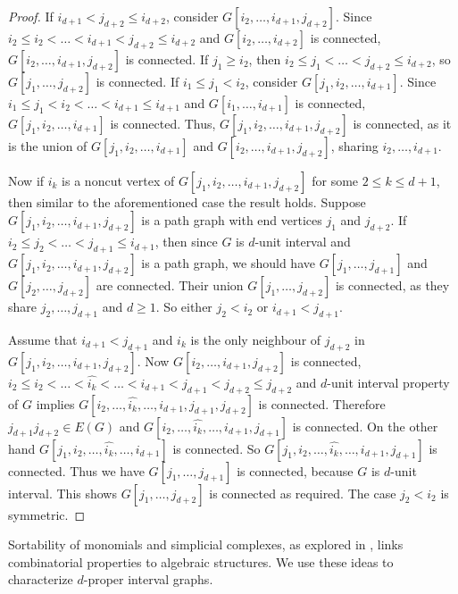 \documentclass[12pt,reqno]{amsart}
\theoremstyle{plain}
\theoremstyle{definition}
\numberwithin{equation}{section}
\begin{document}
\begin{proof}
If $i_{d+1} < j_{d+2} \leq i_{d+2}$, consider $G[i_2, \dots, i_{d+1}, j_{d+2}]$. Since $i_2 \leq i_2 < \dots < i_{d+1} < j_{d+2} \leq i_{d+2}$ and $G[i_2, \dots, i_{d+2}]$ is connected, $G[i_2, \dots, i_{d+1}, j_{d+2}]$ is connected. If $j_1 \geq i_2$, then $i_2 \leq j_1 < \dots < j_{d+2} \leq i_{d+2}$, so $G[j_1, \dots, j_{d+2}]$ is connected. If $i_1 \leq j_1 < i_2$, consider $G[j_1, i_2, \dots, i_{d+1}]$. Since $i_1 \leq j_1 < i_2 < \dots < i_{d+1} \leq i_{d+1}$ and $G[i_1, \dots, i_{d+1}]$ is connected, $G[j_1, i_2, \dots, i_{d+1}]$ is connected. Thus, $G[j_1, i_2, \dots, i_{d+1}, j_{d+2}]$ is connected, as it is the union of $G[j_1, i_2, \dots, i_{d+1}]$ and $G[i_2, \dots, i_{d+1}, j_{d+2}]$, sharing $i_2, \dots, i_{d+1}$.

Now if  $i_k$ is a noncut vertex of $G[j_1, i_2 , \dots , i_{d+1}, j_{d+2}]$ for some $2\leq k \leq d+1$, then similar to the aforementioned case the result holds. Suppose $G[j_1, i_2 , \dots , i_{d+1}, j_{d+2}]$ is a path graph with end vertices $j_1$ and $j_{d+2}$. If $i_2\leq j_2<\dots <j_{d+1} \leq i_{d+1}$, then since $G$ is $d$-unit interval and $G[j_1, i_2 , \dots , i_{d+1}, j_{d+2}]$ is a path graph, we should have $G[j_1, \dots , j_{d+1}]$ and $G[j_2, \dots , j_{d+2}]$ are connected. Their union $G[j_1, \dots, j_{d+2}]$ is connected, as they share $j_2, \dots, j_{d+1}$ and $d \geq 1$. So either $j_2<i_2$ or $i_{d+1}<j_{d+1}$.

Assume that $i_{d+1}<j_{d+1}$ and $i_k$ is the only neighbour of $j_{d+2}$ in $G[j_1, i_2 , \dots , i_{d+1}, j_{d+2}]$. Now $G[i_2, \dots , i_{d+1}, j_{d+2}]$ is connected, $i_2\leq i_2< \dots <\widehat{i_k} < \dots < i_{d+1}<j_{d+1}<j_{d+2}\leq j_{d+2}$ and $d$-unit interval property of $G$ implies $G[ i_2, \dots , \widehat{i_k}, \dots , i_{d+1},j_{d+1},j_{d+2}]$ is connected.  Therefore  $j_{d+1}j_{d+2}\in E(G)$ and $G[ i_2, \dots , \widehat{i_k}, \dots , i_{d+1},j_{d+1}]$ is connected. On the other hand  $G[j_1, i_2, \dots , \widehat{i_k}, \dots , i_{d+1}]$ is connected. So $G[j_1, i_2, \dots , \widehat{i_k}, \dots , i_{d+1},j_{d+1}]$ is  connected. Thus  we have  $G[j_1, \dots , j_{d+1}]$ is connected, because $G$ is $d$-unit interval. This shows $G[j_1, \dots , j_{d+2}]$ is connected as required. The case $j_2<i_2$ is
symmetric.
\end{proof}

Sortability of monomials and simplicial complexes, as explored in \cite{Ene+Herzog,Fahimeh,St95}, links combinatorial properties to algebraic structures. We use these ideas to characterize $d$-proper interval graphs. 
\end{document}
